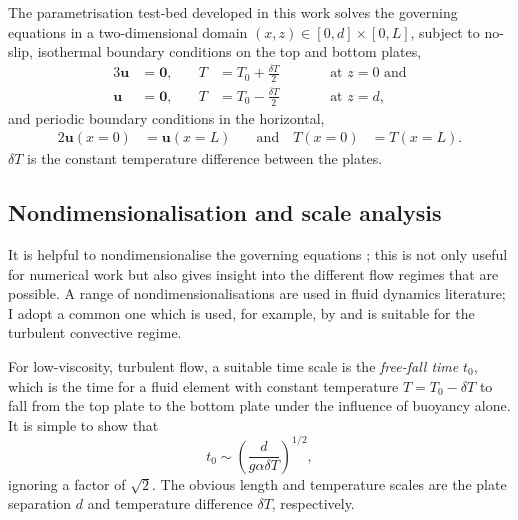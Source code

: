 \documentclass[titlepage]{article}
\numberwithin{equation}{section}
\renewcommand\vec{\bm}
\begin{document}
The parametrisation test-bed developed in this work solves the governing
equations in a two-dimensional domain $(x,z) \in [0, d] \times [0, L]$, subject
to no-slip, isothermal boundary conditions on the top and bottom plates,
\begin{alignat}{3}
    \label{eqn:dim_bc_bot}
    \vec{u} &= \vec{0}, &\quad T &= T_0 + \frac{\delta T}{2}
    &\qquad& \text{at } z = 0 \text{ and} \\
    \label{eqn:dim_bc_top}
    \vec{u} &= \vec{0}, &\quad T &= T_0 - \frac{\delta T}{2}
    &\qquad& \text{at } z = d,
\end{alignat}
and periodic boundary conditions in the horizontal,
\begin{alignat}{2}
    \label{eqn:dim_bc_sides}
    \vec{u}(x=0) &= \vec{u}(x=L) &\quad \text{and} \quad T(x=0) &= T(x=L).
\end{alignat}
$\delta T$ is the constant temperature difference between the plates.

\subsection{Nondimensionalisation and scale analysis}
It is helpful to nondimensionalise the governing equations
; this is not only useful
for numerical work but also gives insight into the different flow regimes
that are possible. A range of nondimensionalisations are used in fluid
dynamics literature; I adopt a common one which is used, for example, by
\textcite{ouertatani2008,stevens2010} and is suitable for the turbulent
convective regime.

For low-viscosity, turbulent flow, a suitable time scale is the
\emph{free-fall time} $t_0$, which is the time for a fluid element with
constant temperature $T = T_0 - \delta T$ to fall from the top plate
to the bottom plate under the influence of buoyancy alone. It is simple
to show that
\[
    t_0 \sim \left( \frac{d}{g \alpha \delta T} \right)^{1/2},
\]
ignoring a factor of $\sqrt{2}$. The obvious length and temperature
scales are the plate separation $d$ and temperature difference $\delta T$,
respectively.
\end{document}
